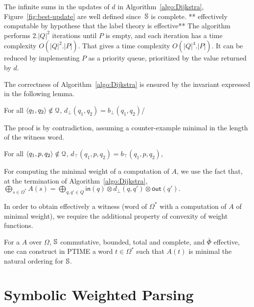 \noindent
The infinite sums in the updates of $d$ in Algorithm~\ref{algo:Dijkstra}, 
Figure~\ref{fig:best-update}
are well defined
since~$\mathbb{S}$ is complete.
** effectively computable by hypothese that the label theory is effective**
The algorithm performs $2.|Q|^2$ iterations until $P$ is empty, 
and each iteration has a time complexity $O(|Q|^2 . |P|)$.
That gives a time complexity $O(|Q|^4 . |P|)$. 
It can be reduced by implementing $P$ as a priority queue, 
prioritized by the value returned by $d$.

The correctness of Algorithm~\ref{algo:Dijkstra} 
is ensured by the invariant expressed in the following lemma.
\begin{lemma}\label{lem:bot}
For all $\< q_1, q_2> \notin \Q$,
$d_\bot(q_1, q_2) =  b_\bot(q_1, q_2)$/
\end{lemma}
The proof is by contradiction, 
assuming a counter-example minimal in the length of the witness word.

\begin{lemma}\label{lem:top}
For all $\< q_1, p, q_2> \notin \Q$, 
$d_\top(q_1, p, q_2) =  b_\top(q_1, p, q_2)$,
\end{lemma}

\noindent
For computing the minimal weight of a computation of $A$, we use the fact that,
at the termination of Algorithm~\ref{algo:Dijkstra}, %
\(
  {\displaystyle \bigoplus_{s \in \Omega^*} A(s)} = 
  {\displaystyle\bigoplus_{q, q' \in Q}} \textstyle
  \mathsf{in}(q) \mathop{\otimes} d_\bot(q, q') \mathop{\otimes} \mathsf{out}(q').
\)

\noindent
In order to obtain effectively a witness 
(word of $\Omega^*$ with a computation of $A$ of minimal weight), 
we require the additional property of convexity of weight functions.

\begin{proposition}\label{th:best-search}
For a \SWVPA $A$ 
over $\Omega$, 
$\mathbb{S}$ commutative, bounded, total and complete, %
and $\bar\Phi$ effective, %
one can construct in PTIME a word $t \in \Omega^*$ 
such that $A(t)$ is minimal \wrt the natural ordering for $\mathbb{S}$. 
\end{proposition} 





\section{Symbolic Weighted Parsing}
\label{sec:parsing}

